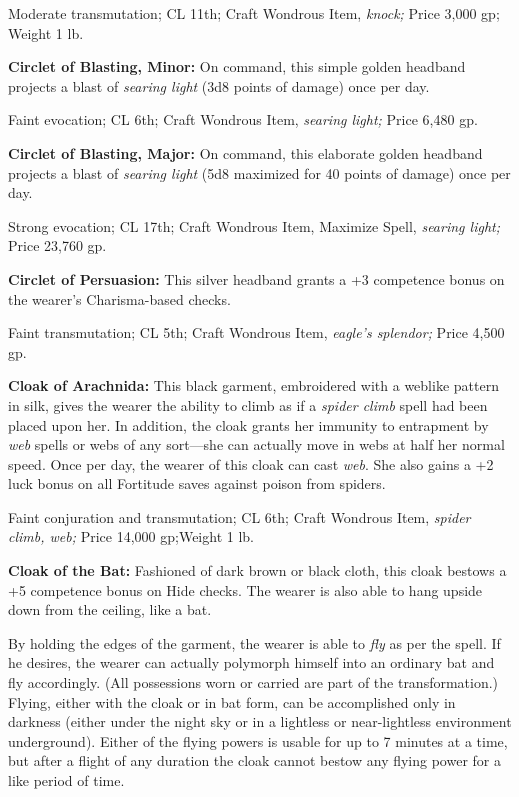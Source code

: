 Moderate transmutation; CL 11th; Craft Wondrous Item, \textit{knock; }Price 3,000 
gp; Weight 1 lb.

\textbf{Circlet of Blasting, Minor:} On command, this simple golden headband projects 
a blast of \textit{searing light }(3d8 points of damage) once per day.

Faint evocation; CL 6th; Craft Wondrous Item, \textit{searing light; }Price 6,480 
gp.

\textbf{Circlet of Blasting, Major:} On command, this elaborate golden headband 
projects a blast of \textit{searing light }(5d8 maximized for 40 points of damage) 
once per day.

Strong evocation; CL 17th; Craft Wondrous Item, Maximize Spell, \textit{searing 
light; }Price 23,760 gp.

\textbf{Circlet of Persuasion:} This silver headband grants a +3 competence bonus 
on the wearer's Charisma-based checks.

Faint transmutation; CL 5th; Craft Wondrous Item, \textit{eagle's splendor; }Price 
4,500 gp.

\textbf{Cloak of Arachnida:} This black garment, embroidered with a weblike pattern 
in silk, gives the wearer the ability to climb as if a \textit{spider climb }spell 
had been placed upon her. In addition, the cloak grants her immunity to entrapment 
by \textit{web }spells or webs of any sort---she can actually move in webs at half 
her normal speed. Once per day, the wearer of this cloak can cast \textit{web}. 
She also gains a +2 luck bonus on all Fortitude saves against poison from spiders.

Faint conjuration and transmutation; CL 6th; Craft Wondrous Item, \textit{spider 
climb, web; }Price 14,000 gp;Weight 1 lb.

\textbf{Cloak of the Bat:} Fashioned of dark brown or black cloth, this cloak bestows 
a +5 competence bonus on Hide checks. The wearer is also able to hang upside down 
from the ceiling, like a bat.

By holding the edges of the garment, the wearer is able to \textit{fly }as per 
the spell. If he desires, the wearer can actually polymorph himself into an ordinary 
bat and fly accordingly. (All possessions worn or carried are part of the transformation.) 
Flying, either with the cloak or in bat form, can be accomplished only in darkness 
(either under the night sky or in a lightless or near-lightless environment underground). 
Either of the flying powers is usable for up to 7 minutes at a time, but after 
a flight of any duration the cloak cannot bestow any flying power for a like period 
of time.

